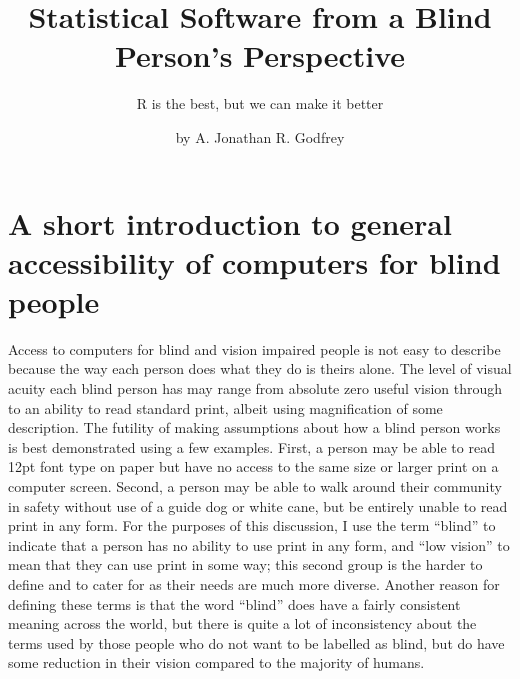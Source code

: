 \newcommand{\html}{{\sc html}}
\newcommand{\xml}{{\sc xml}}
\newcommand{\pdf}{{\sc pdf}}

\title{Statistical Software from a Blind Person's Perspective}
\subtitle{R is the best, but we can make it better}
\author{by A. Jonathan R. Godfrey}
\maketitle
{}


\section{A short introduction to general accessibility of computers for blind people}

Access to computers for blind and vision impaired people is not easy to describe because the way each person does what they do is theirs alone. The level of visual acuity each blind person has may range from absolute zero useful vision through to an ability to read standard print, albeit using magnification of some description. The futility of making assumptions about how a blind person works is best demonstrated using a few examples. First, a person may be able to read 12pt font type on paper but have no access to the same size or larger print on a computer screen. Second, a person may be able to walk around their   community in safety without use of a guide dog or white cane, but be entirely unable to read print in any form. For the purposes of this discussion, I use the term ``blind'' to indicate that a person has no ability to use print in any form, and ``low vision'' to mean that they can use print in some way; this second group is the harder to define and to cater for as their needs are much more diverse. Another reason for defining these terms is that the word ``blind'' does have a fairly consistent meaning across the world, but there is quite  a lot of inconsistency about the terms used by those people who do not want to be labelled as blind, but do have some reduction in their vision compared to the majority of humans.

